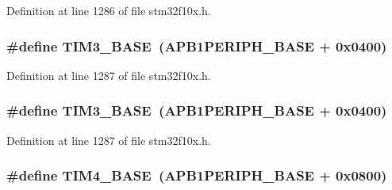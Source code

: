 Definition at line 1286 of file stm32f10x.\+h.

\subsubsection[{\texorpdfstring{T\+I\+M3\+\_\+\+B\+A\+SE}{TIM3_BASE}}]{\setlength{\rightskip}{0pt plus 5cm}\#define T\+I\+M3\+\_\+\+B\+A\+SE~({\bf A\+P\+B1\+P\+E\+R\+I\+P\+H\+\_\+\+B\+A\+SE} + 0x0400)}\hypertarget{group___peripheral__memory__map_gaf0c34a518f87e1e505cd2332e989564a}{}\label{group___peripheral__memory__map_gaf0c34a518f87e1e505cd2332e989564a}


Definition at line 1287 of file stm32f10x.\+h.

\subsubsection[{\texorpdfstring{T\+I\+M3\+\_\+\+B\+A\+SE}{TIM3_BASE}}]{\setlength{\rightskip}{0pt plus 5cm}\#define T\+I\+M3\+\_\+\+B\+A\+SE~({\bf A\+P\+B1\+P\+E\+R\+I\+P\+H\+\_\+\+B\+A\+SE} + 0x0400)}\hypertarget{group___peripheral__memory__map_gaf0c34a518f87e1e505cd2332e989564a}{}\label{group___peripheral__memory__map_gaf0c34a518f87e1e505cd2332e989564a}


Definition at line 1287 of file stm32f10x.\+h.

\subsubsection[{\texorpdfstring{T\+I\+M4\+\_\+\+B\+A\+SE}{TIM4_BASE}}]{\setlength{\rightskip}{0pt plus 5cm}\#define T\+I\+M4\+\_\+\+B\+A\+SE~({\bf A\+P\+B1\+P\+E\+R\+I\+P\+H\+\_\+\+B\+A\+SE} + 0x0800)}\hypertarget{group___peripheral__memory__map_ga56e2d44b0002f316527b8913866a370d}{}\label{group___peripheral__memory__map_ga56e2d44b0002f316527b8913866a370d}


